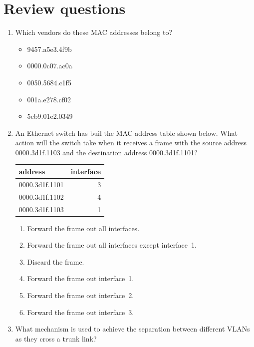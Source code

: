 \section{Review questions}
\label{sec:ethernet-review-questions}
\begin{enumerate}
\item Which vendors do these \acs{MAC} addresses belong to?
   \begin{itemize}
   \item 9457.a5e3.4f9b
   \item 0000.0c07.ac0a
   \item 0050.5684.c1f5
   \item 001a.e278.cf02
   \item 5cb9.01e2.0349
   \end{itemize}
\item
   An Ethernet switch has buil the \acs{MAC} address table shown below.
   What action will the switch take when it receives a frame with the source address 0000.3d1f.1103 and the destination address 0000.3d1f.1101?
   \begin{center}
   \begin{tabular}{lr}
   address & interface \\
   \midrule
   0000.3d1f.1101 & 3 \\
   0000.3d1f.1102 & 4 \\
   0000.3d1f.1103 & 1 \\
   \end{tabular}
   \end{center}
   \begin{enumerate}
   \item Forward the frame out all interfaces.
   \item Forward the frame out all interfaces except interface~1.
   \item Discard the frame.
   \item Forward the frame out interface~1.
   \item Forward the frame out interface~2.
   \item Forward the frame out interface~3.
   \end{enumerate}
\item
   What mechanism is used to achieve the separation between different \acsp{VLAN} as they cross a trunk link?

\end{enumerate}
